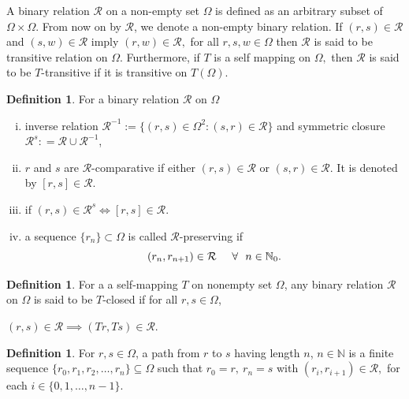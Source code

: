 \documentclass[10pt, reqno]{amsart}
\theoremstyle{definition}
\newtheorem{definition}[theorem]{Definition}
\theoremstyle{remark}
\numberwithin{equation}{section}
\begin{document}
 A binary relation $\mathcal{R}$ on a non-empty set $ \Omega $ is defined as an arbitrary subset  of $\Omega \times \Omega $. 
 From now on by $\mathcal{R}$, we denote a non-empty binary relation. If $( r, s ) \in \mathcal{R}$ and $ ( s, w ) \in \mathcal{R}$ imply $ ( r, w ) \in \mathcal{R},$ for all $ r, s, w \in \Omega $ then $\mathcal{R}$ is said to be transitive relation on $\Omega $. Furthermore, if $T$ is a self mapping on $ \Omega,$ then $\mathcal{R}$ is said to be $T$-transitive if it is transitive on $ T( \Omega )$.

\begin{definition}\cite{alam2015relation}
	For a binary relation $\mathcal{R}$    on $ \Omega $  
	\begin{enumerate}[(i)]
		\item  inverse relation $\mathcal{R}^{-1}:=\lbrace ( r, s )\in  \Omega^{2} : ( s, r ) \in \mathcal{R} \rbrace $ and  symmetric closure
		$\mathcal{R}^{s} : = \mathcal{R} \cup \mathcal{R}^{-1} $,
		\item $ r $ and $ s $ are $\mathcal{R}$-comparative   if either $( r, s )\in \mathcal{R}$ or $( s, r )\in \mathcal{R}$. It is denoted by $ [ r, s ]  \in \mathcal{R}.$
		\item if $( r, s ) \in \mathcal{R}^{s} \Longleftrightarrow [ r, s ] \in \mathcal{R}$.
		\item  a sequence $\lbrace { r_{n}}\rbrace \subset \Omega $ is called   $\mathcal{R}$-preserving  if
		 $$( r_{n}, r_{n+1})\in \mathcal{R} \hspace{0.5cm} \forall ~~n\in \mathbb{N}_{0}.$$ 
	\end{enumerate}
\end{definition}

\begin{definition} \cite{alam2015relation} \label{fclosed}
	For a  a self-mapping $T$ on nonempty set $ \Omega $, any binary relation $\mathcal{R}$ on $\Omega $ is said to be $T$-closed if for all $ r, s \in \Omega $,
	\begin{center}
		$( r, s ) \in \mathcal{R} \implies (T r, T s) \in \mathcal{R}.$
	\end{center}
\end{definition}


\begin{definition}\cite{kolman2000discrete}
	For $ r, s \in \Omega $, a path from $ r$ to $ s $ having length $n$, $n\in\mathbb{N}$    is a finite sequence  $\{r_0, r_1, r_2, \ldots, r_n\}\subseteq \Omega $ such that $ r_0 = r,\ r_n = s $ with $ ( r_i, r_{i+1} ) \in\mathcal{R},$ for each $i\in\{0,1,\ldots,n-1\}$.
\end{definition}
	
\end{document}
